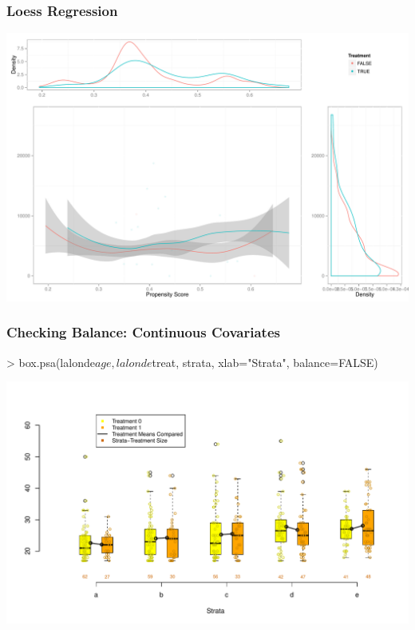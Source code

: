 \documentclass[10pt,slidestop,mathserif,c]{beamer}
\begin{document}
\begin{frame}[containsverbatim,fragile,shrink=.8]
    \frametitle{Loess Regression}
    \begin{center}
        \includegraphics{figures/Slides-loessplot}
    \end{center}    
\end{frame}



\begin{frame}
    \frametitle{Checking Balance: Continuous Covariates}
\begin{Schunk}
\begin{Sinput}
> box.psa(lalonde$age, lalonde$treat, strata, xlab="Strata", 
   balance=FALSE)
\end{Sinput}
\end{Schunk}
    \begin{center}
        \includegraphics{figures/Slides-boxpsa}
    \end{center}
\end{frame}
\end{document}
